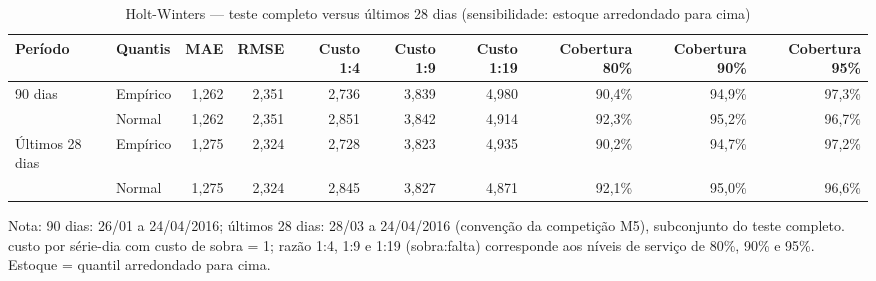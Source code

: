 \begin{table}[htbp]
\centering
\small
\caption{Holt-Winters — teste completo versus últimos 28 dias (sensibilidade: estoque arredondado para cima)}
\label{tab:hw_verificacao_28d_sensibilidade}
\begin{tabular}{llrrrrrrrr}
\toprule
Período & Quantis & MAE & RMSE & Custo 1:4 & Custo 1:9 & Custo 1:19 & Cobertura 80\% & Cobertura 90\% & Cobertura 95\% \\
\midrule
90 dias & Empírico & 1,262 & 2,351 & 2,736 & 3,839 & 4,980 & 90,4\% & 94,9\% & 97,3\% \\
 & Normal & 1,262 & 2,351 & 2,851 & 3,842 & 4,914 & 92,3\% & 95,2\% & 96,7\% \\
\addlinespace
Últimos 28 dias & Empírico & 1,275 & 2,324 & 2,728 & 3,823 & 4,935 & 90,2\% & 94,7\% & 97,2\% \\
 & Normal & 1,275 & 2,324 & 2,845 & 3,827 & 4,871 & 92,1\% & 95,0\% & 96,6\% \\
\bottomrule
\end{tabular}
\par\smallskip
{\footnotesize Nota: 90 dias: 26/01 a 24/04/2016; últimos 28 dias: 28/03 a 24/04/2016 (convenção da competição M5), subconjunto do teste completo. custo por série-dia com custo de sobra = 1; razão 1:4, 1:9 e 1:19 (sobra:falta) corresponde aos níveis de serviço de 80\%, 90\% e 95\%. Estoque = quantil arredondado para cima.}
\end{table}
